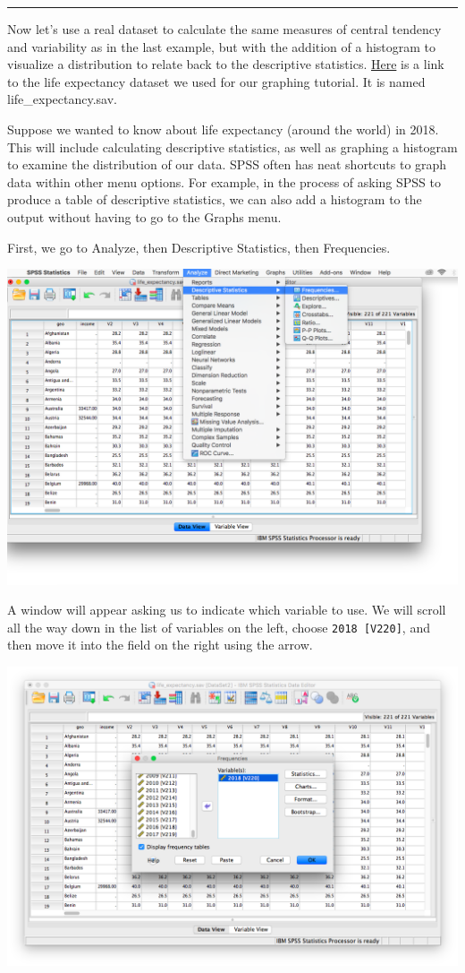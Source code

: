 \documentclass[
]{book}
\begin{document}
\begin{center}\rule{0.5\linewidth}{0.5pt}\end{center}

Now let's use a real dataset to calculate the same measures of central tendency and variability as in the last example, but with the addition of a histogram to visualize a distribution to relate back to the descriptive statistics. \href{https://github.com/CrumpLab/statisticsLab/blob/master/data/spssdata/life_expectancy.sav}{Here} is a link to the life expectancy dataset we used for our graphing tutorial. It is named life\_expectancy.sav.

Suppose we wanted to know about life expectancy (around the world) in 2018. This will include calculating descriptive statistics, as well as graphing a histogram to examine the distribution of our data. SPSS often has neat shortcuts to graph data within other menu options. For example, in the process of asking SPSS to produce a table of descriptive statistics, we can also add a histogram to the output without having to go to the Graphs menu.

First, we go to {Analyze}, then {Descriptive Statistics}, then {Frequencies}.

\includegraphics{img/2.4.16.png}

A window will appear asking us to indicate which variable to use. We will scroll all the way down in the list of variables on the left, choose \texttt{2018\ {[}V220{]}}, and then move it into the field on the right using the arrow.

\includegraphics{img/2.4.17.png}
\end{document}
